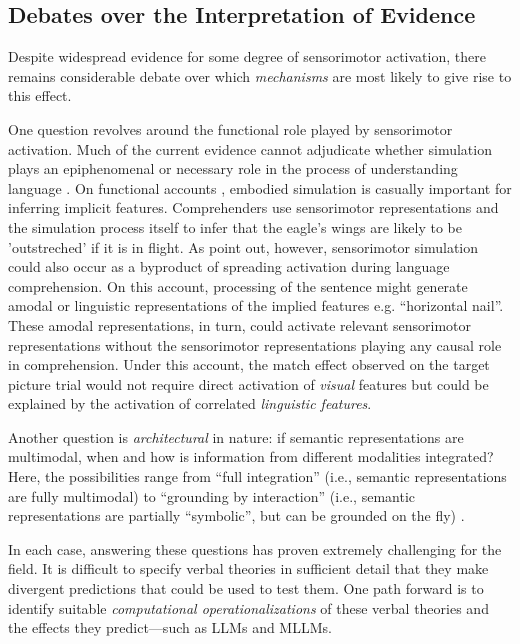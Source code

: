 \documentclass[11pt]{article}
\begin{document}
\subsection{Debates over the Interpretation of Evidence}\label{sec:human_debate}

Despite widespread evidence for some degree of sensorimotor activation, there remains considerable debate over which \textit{mechanisms} are most likely to give rise to this effect. 

One question revolves around the functional role played by sensorimotor activation. Much of the current evidence cannot adjudicate whether simulation plays an epiphenomenal or necessary role in the process of understanding language \cite{mahon2008critical, ostarek2021towards}. On functional accounts \citet{barsalou1999perceptual}, embodied simulation is casually important for inferring implicit features. Comprehenders use sensorimotor representations and the simulation process itself to infer that the eagle's wings are likely to be 'outstreched' if it is in flight.
As \citet{mahon2008critical} point out, however, sensorimotor simulation could also occur as a byproduct of spreading activation during language comprehension. On this account, processing of the sentence might generate amodal or linguistic representations of the implied features e.g. ``horizontal nail''. These amodal representations, in turn, could activate relevant sensorimotor representations without the sensorimotor representations playing any causal role in comprehension. Under this account, the match effect observed on the target picture trial would not require direct activation of \textit{visual} features but could be explained by the activation of correlated \textit{linguistic features}.

Another question is \textit{architectural} in nature: if semantic representations are multimodal, when and how is information from different modalities integrated? Here, the possibilities range from ``full integration'' (i.e., semantic representations are fully multimodal) to ``grounding by interaction'' (i.e., semantic representations are partially ``symbolic'', but can be grounded on the fly) \cite{mahon2008critical, meteyardComingAgeReview2012}. 

In each case, answering these questions has proven extremely challenging for the field. It is difficult to specify verbal theories in sufficient detail that they make divergent predictions that could be used to test them. One path forward is to identify suitable \textit{computational operationalizations} of these verbal theories and the effects they predict---such as LLMs and MLLMs.
\end{document}
